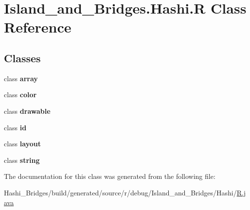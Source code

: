 \hypertarget{class_island__and___bridges_1_1_hashi_1_1_r}{}\section{Island\+\_\+and\+\_\+\+Bridges.\+Hashi.\+R Class Reference}
\label{class_island__and___bridges_1_1_hashi_1_1_r}
\subsection*{Classes}
\begin{DoxyCompactItemize}
\item 
class {\bfseries array}
\item 
class {\bfseries color}
\item 
class {\bfseries drawable}
\item 
class {\bfseries id}
\item 
class {\bfseries layout}
\item 
class {\bfseries string}
\end{DoxyCompactItemize}


The documentation for this class was generated from the following file\+:\begin{DoxyCompactItemize}
\item 
Hashi\+\_\+\+Bridges/build/generated/source/r/debug/\+Island\+\_\+and\+\_\+\+Bridges/\+Hashi/\mbox{\hyperlink{debug_2_island__and___bridges_2_hashi_2_r_8java}{R.\+java}}\end{DoxyCompactItemize}
